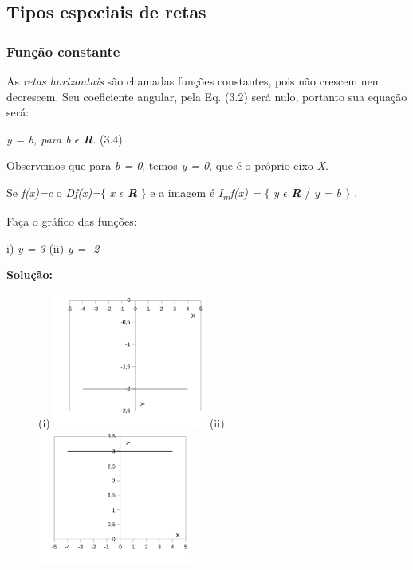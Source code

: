 \subsection{Tipos especiais de retas}

\subsubsection{Função constante}

As \textit{retas horizontais} são chamadas funções constantes, pois não crescem nem decrescem. Seu coeficiente angular, pela Eq. (3.2) será nulo, portanto sua equação será:

\begin{caixa}
\textit{y = b, para b $ \epsilon $  \textbf{R}}. \tab (3.4)
\end{caixa}

Observemos que para \textit{b = 0}, temos \textit{y = 0}, que é o próprio eixo \textit{X}.

Se \textit{f(x)=c}  o \textit{Df(x)=}$ \{ $ \textit{ x $ \epsilon $  \textbf{R}} $ \} $  e a imagem é    \textit{I\textsubscript{m}f(x) =} $ \{ $ \textit{ y $ \epsilon $  \textbf{R}} / \textit{y = b }$ \} $ .

\begin{texemplo}
Faça o gráfico das funções: 

i) \textit{y = 3} \tab (ii) \textit{y = -2}

\textbf{Solução:}

\begin{figure}[H]
	(i) \includegraphics[width=0.45\textwidth]{capitulos/funcao_do_primeiro_grau/media/image16.pdf} 
	(ii) \includegraphics[width=0.45\textwidth]{capitulos/funcao_do_primeiro_grau/media/image17.pdf}
\end{figure}
\end{texemplo}

